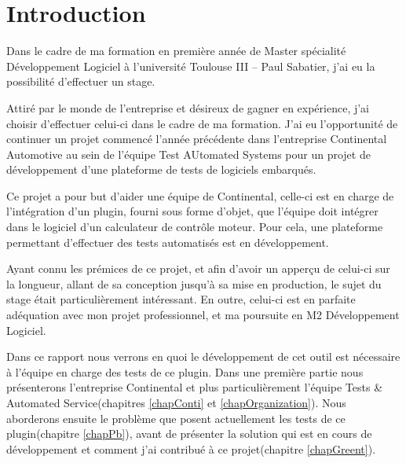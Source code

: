 \chapter*{Introduction}
Dans le cadre de ma formation en première année de Master spécialité Développement Logiciel à l'université Toulouse III – Paul Sabatier, j'ai eu la possibilité d'effectuer un stage.

Attiré par le monde de l'entreprise et désireux de gagner en expérience, j'ai choisir d'effectuer celui-ci dans le cadre de ma formation. 
J'ai eu l'opportunité de continuer un projet commencé l'année précédente dans l'entreprise Continental Automotive au sein de l'équipe Test AUtomated Systems pour un projet de développement d'une plateforme de tests de logiciels embarqués.

Ce projet a pour but d'aider une équipe de Continental, celle-ci est en charge de l'intégration d'un plugin, fourni sous forme d'objet, que l'équipe doit intégrer dans le logiciel d'un calculateur de contrôle moteur. Pour cela, une plateforme permettant d'effectuer des tests automatisés est en développement.

Ayant connu les prémices de ce projet, et afin d'avoir un apperçu de celui-ci sur la longueur, allant de sa conception jusqu'à sa mise en production, le sujet du stage était particulièrement intéressant. En outre, celui-ci est en parfaite adéquation avec mon projet professionnel, et ma poursuite en M2 Développement Logiciel.


Dans ce rapport nous verrons en quoi le développement de cet outil est nécessaire à l'équipe en charge des tests de ce plugin. Dans une première partie nous présenterons l'entreprise Continental et plus particulièrement l'équipe Tests \& Automated Service(chapitres \ref{chapConti} et \ref{chapOrganization}). Nous aborderons ensuite le problème que posent actuellement les tests de ce plugin(chapitre \ref{chapPb}), avant de présenter la solution qui est en cours de développement et comment j'ai contribué à ce projet(chapitre \ref{chapGreent}). 
